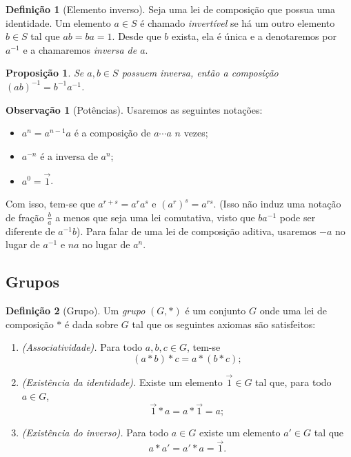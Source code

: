 \documentclass[a4paper,12pt]{report}
\theoremstyle{plain}
\newtheorem{proposicao}{Proposição}[section]
\theoremstyle{definition}
\newtheorem{definicao}{Definição}[section]
\newtheorem{observacao}{Observação}[section]
\begin{document}
	\begin{definicao}[Elemento inverso]
		Seja uma lei de composição que possua uma identidade. Um elemento \(a\in S\) é chamado \emph{invertível} se há um outro elemento \(b\in S\) tal que \(ab = ba = 1\). Desde que \(b\) exista, ela é única e a denotaremos por \(a^{-1}\) e a chamaremos
		\emph{inversa de $a$}.
	\end{definicao}
	
	
	\begin{proposicao}
		Se \(a,b\in S\) possuem inversa, então a composição \((ab)^{-1} = b^{-1}a^{-1}\).
	\end{proposicao}
	
	\begin{observacao}[Potências]
		Usaremos as seguintes notações:
		\begin{itemize}
			\item \(a^n = a^{n-1}a\) é a composição de \(a\dotsb a\) \(n\) vezes;
			\item \(a^{-n}\) é a inversa de \(a^n\);
			\item \(a^0 = \vec{1}\).
		\end{itemize}
	
		Com isso, tem-se que \(a^{r+s} = a^ra^s\) e \((a^r)^s = a^{rs}\). (Isso
		não induz uma notação de fração \(\frac{b}{a}\) a menos que seja uma lei
		comutativa, visto que \(ba^{-1}\) pode ser diferente de \(a^{-1}b\)).
		Para falar de uma lei de composição aditiva, usaremos \(-a\) no lugar de
		\(a^{-1}\) e \(na\) no lugar de \(a^n\).
	\end{observacao}
	
	\subsection{Grupos}
	
	\begin{definicao}[Grupo]
		
		Um \emph{grupo} $(G,*)$ é um conjunto \(G\) onde uma lei de
		composição $*$ é dada sobre \(G\) tal que os seguintes axiomas são satisfeitos:
		
		\begin{enumerate}
			\item \emph{(Associatividade).} Para todo $a,b,c \in G$, tem-se $$(a*b)*c = a*(b*c);$$
			\item \emph{(Existência da identidade).} Existe um elemento $\vec{1}\in G$ tal que, para todo $a\in G$, $$\vec{1}*a = a*\vec{1} = a;$$
			\item \emph{(Existência do inverso).} Para todo $a\in G$ existe um elemento $a'\in G$ tal que $$a*a' = a'*a = \vec{1}.$$
		\end{enumerate}
	\end{definicao}
	
\end{document}

